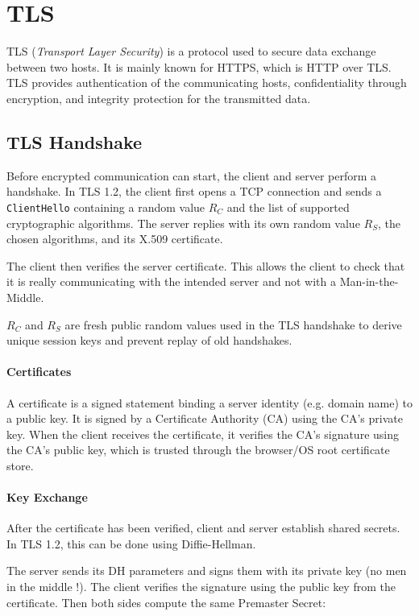 \section{TLS}

TLS (\emph{Transport Layer Security}) is a protocol used to secure data
exchange between two hosts. It is mainly known for HTTPS, which is HTTP
over TLS. TLS provides authentication of the communicating hosts,
confidentiality through encryption, and integrity protection for the
transmitted data.

\subsection{TLS Handshake}

Before encrypted communication can start, the client and server perform a
handshake. In TLS 1.2, the client first opens a TCP connection and sends
a \texttt{ClientHello} containing a random value $R_C$ and the list of
supported cryptographic algorithms. The server replies with its own
random value $R_S$, the chosen algorithms, and its X.509 certificate.

The client then verifies the server certificate. This allows the client
to check that it is really communicating with the intended server and not
with a Man-in-the-Middle.

$R_C$ and $R_S$ are fresh public random values used in the TLS handshake
to derive unique session keys and prevent replay of old handshakes.
\paragraph{Certificates}

A certificate is a signed statement binding a server identity
(e.g. domain name) to a public key. It is signed by a Certificate
Authority (CA) using the CA's private key. When the client receives the
certificate, it verifies the CA's signature using the CA's public key,
which is trusted through the browser/OS root certificate store.


\paragraph{Key Exchange}

After the certificate has been verified, client and server establish
shared secrets. In TLS 1.2, this can be done using Diffie-Hellman.

The server sends its DH parameters and signs them with its private key (no men in the middle !).
The client verifies the signature using the public key from the
certificate. Then both sides compute the same Premaster Secret:

